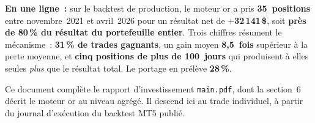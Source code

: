 \documentclass[11pt, a4paper]{scrartcl}
\begin{document}
\vspace{0.8cm}

\begin{thesisbox}
\textbf{En une ligne~:} sur le backtest de production, le moteur or a pris
\textbf{35~positions} entre novembre~2021 et avril~2026 pour un résultat net de
\textbf{$+$32\,141\,\$}, soit \textbf{près de 80\,\% du résultat du portefeuille
entier}. Trois chiffres résument le mécanisme~: \textbf{31\,\% de trades
gagnants}, un gain moyen \textbf{8,5~fois} supérieur à la perte moyenne, et
\textbf{cinq positions de plus de 100~jours} qui produisent à elles seules
\emph{plus} que le résultat total. Le portage en prélève \textbf{28\,\%}.
\end{thesisbox}

\vspace{0.4cm}

{\small\color{slateGrey}\sffamily
Ce document complète le rapport d'investissement \texttt{main.pdf}, dont la
section~6 décrit le moteur or au niveau agrégé. Il descend ici au trade
individuel, à partir du journal d'exécution du backtest MT5 publié.}

\clearpage

\tableofcontents
\clearpage










\end{document}
